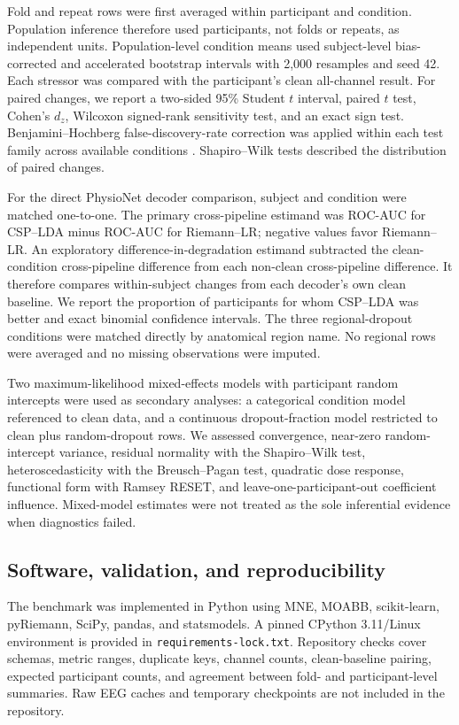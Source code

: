 \documentclass[11pt]{article}
\begin{document}
Fold and repeat rows were first averaged within participant and condition. Population inference therefore used participants, not folds or repeats, as independent units. Population-level condition means used subject-level bias-corrected and accelerated bootstrap intervals with 2,000 resamples and seed 42. Each stressor was compared with the participant's clean all-channel result. For paired changes, we report a two-sided 95\% Student $t$ interval, paired $t$ test, Cohen's $d_z$, Wilcoxon signed-rank sensitivity test, and an exact sign test. Benjamini--Hochberg false-discovery-rate correction was applied within each test family across available conditions \cite{Benjamini_1995}. Shapiro--Wilk tests described the distribution of paired changes.

For the direct PhysioNet decoder comparison, subject and condition were matched one-to-one. The primary cross-pipeline estimand was ROC-AUC for CSP--LDA minus ROC-AUC for Riemann--LR; negative values favor Riemann--LR. An exploratory difference-in-degradation estimand subtracted the clean-condition cross-pipeline difference from each non-clean cross-pipeline difference. It therefore compares within-subject changes from each decoder's own clean baseline. We report the proportion of participants for whom CSP--LDA was better and exact binomial confidence intervals. The three regional-dropout conditions were matched directly by anatomical region name. No regional rows were averaged and no missing observations were imputed.

Two maximum-likelihood mixed-effects models with participant random intercepts were used as secondary analyses: a categorical condition model referenced to clean data, and a continuous dropout-fraction model restricted to clean plus random-dropout rows. We assessed convergence, near-zero random-intercept variance, residual normality with the Shapiro--Wilk test, heteroscedasticity with the Breusch--Pagan test, quadratic dose response, functional form with Ramsey RESET, and leave-one-participant-out coefficient influence. Mixed-model estimates were not treated as the sole inferential evidence when diagnostics failed.

\subsection{Software, validation, and reproducibility}
The benchmark was implemented in Python using MNE, MOABB, scikit-learn, pyRiemann, SciPy, pandas, and statsmodels. A pinned CPython 3.11/Linux environment is provided in \texttt{requirements-lock.txt}. Repository checks cover schemas, metric ranges, duplicate keys, channel counts, clean-baseline pairing, expected participant counts, and agreement between fold- and participant-level summaries. Raw EEG caches and temporary checkpoints are not included in the repository.
\end{document}
